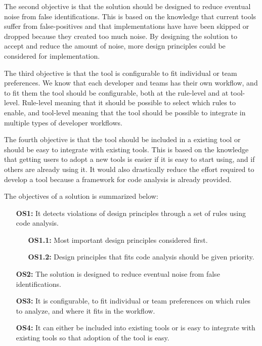 \documentclass{report}
\begin{document}
The second objective is that the solution should be designed to reduce eventual noise from false identifications. This is based on the knowledge that current tools suffer from false-positives and that implementations have have been skipped or dropped because they created too much noise. By designing the solution to accept and reduce the amount of noise, more design principles could be considered for implementation.

The third objective is that the tool is configurable to fit individual or team preferences. We know that each developer and teams has their own workflow, and to fit them the tool should be configurable, both at the rule-level and at tool-level. Rule-level meaning that it should be possible to select which rules to enable, and tool-level meaning that the tool should be possible to integrate in multiple types of developer workflows.

The fourth objective is that the tool should be included in a existing tool or should be easy to integrate with existing tools. This is based on the knowledge that getting users to adopt a new tools is easier if it is easy to start using, and if others are already using it. It would also drastically reduce the effort required to develop a tool because a framework for code analysis is already provided. 

The objectives of a solution is summarized below:
\begin{itemize}
    \item [\textbf{OS1:}] It detects violations of design principles through a set of rules using code analysis.
    \begin{itemize}
        \item [\textbf{OS1.1:}] Most important design principles considered first.
        \item [\textbf{OS1.2:}] Design principles that fits code analysis should be given priority.
    \end{itemize}
    \item [\textbf{OS2:}] The solution is designed to reduce eventual noise from false identifications. 
    \item [\textbf{OS3:}] It is configurable, to fit individual or team preferences on which rules to analyze, and where it fits in the workflow.
    \item [\textbf{OS4:}] It can either be included into existing tools or is easy to integrate with existing tools so that adoption of the tool is easy.
\end{itemize}
\end{document}
